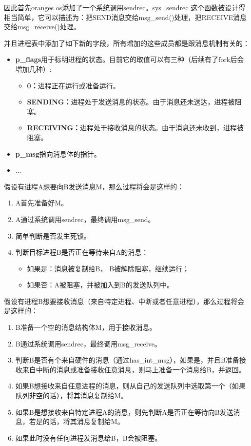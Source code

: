 \documentclass{whureport}
\begin{document}
因此首先oranges os添加了一个系统调用sendrec。sys\_sendrec 这个函数被设计得相当简单，它可以描述为：把SEND消息交给msg\_send()处理，把RECEIVE消息交给msg\_receive()处理。

并且进程表中添加了如下新的字段，所有增加的这些成员都是跟消息机制有关的：
\begin{itemize}
  \item \textbf{p\_flags}用于标明进程的状态。目前它的取值可以有三种（后续有了fork后会增加几种）:
  \begin{itemize}
  \item \textbf{0：}进程正在运行或准备运行。
  \item \textbf{SENDING：}进程处于发送消息的状态。由于消息还未送达，进程被阻塞。
  \item \textbf{RECEIVING：}进程处于接收消息的状态。由于消息还未收到，进程被阻塞。
\end{itemize}
\item \textbf{p\_msg}指向消息体的指针。
\item ...
\end{itemize}

假设有进程A想要向B发送消息M，那么过程将会是这样的：
\begin{enumerate}
	\item A首先准备好M。
	\item  A通过系统调用sendrec，最终调用msg\_send。
	\item 简单判断是否发生死锁。
	\item 判断目标进程B是否正在等待来自A的消息：
	\begin{itemize}
  \item 如果是：消息被复制给B， B被解除阻塞，继续运行；
  \item 如果否：A被阻塞，并被加入到B的发送队列中。
\end{itemize}

\end{enumerate}

假设有进程B想要接收消息（来自特定进程、中断或者任意进程），那么过程将会是这样的：

\begin{enumerate}
	\item B准备一个空的消息结构体M，用于接收消息。
	\item B通过系统调用sendrec，最终调用msg\_receive。
	\item 判断B是否有个来自硬件的消息（通过has\_int\_msg），如果是，并且B准备接收来自中断的消息或准备接收任意消息，则马上准备一个消息给B，并返回。
	\item 如果B想接收来自任意进程的消息，则从自己的发送队列中选取第一个（如果队列非空的话），将其消息复制给M。
	\item 如果B是想接收来自特定进程A的消息，则先判断A是否正在等待向B发送消息，若是的话，将其消息复制给M。
	\item 如果此时没有任何进程发消息给B，B会被阻塞。
\end{enumerate}
\end{document}
